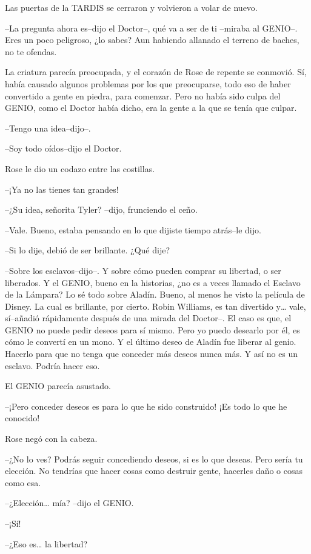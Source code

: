 Las puertas de la TARDIS se cerraron y volvieron a volar de nuevo.

--La pregunta ahora es--dijo el Doctor--, qué va a ser de ti --miraba al
GENIO--. Eres un poco peligroso, ¿lo sabes? Aun habiendo allanado el
terreno de baches, no te ofendas.

La criatura parecía preocupada, y el corazón de Rose de repente se
conmovió. Sí, había causado algunos problemas por los que preocuparse,
todo eso de haber convertido a gente en piedra, para comenzar. Pero no
había sido culpa del GENIO, como el Doctor había dicho, era la gente a
la que se tenía que culpar.

--Tengo una idea--dijo--.

--Soy todo oídos--dijo el Doctor.

Rose le dio un codazo entre las costillas.

--¡Ya no las tienes tan grandes!

--¿Su idea, señorita Tyler? --dijo, frunciendo el ceño.

--Vale. Bueno, estaba pensando en lo que dijiste tiempo atrás--le dijo.

--Si lo dije, debió de ser brillante. ¿Qué dije?

--Sobre los esclavos--dijo--. Y sobre cómo pueden comprar su libertad, o
ser liberados. Y el GENIO, bueno en la historias, ¿no es a veces llamado
el Esclavo de la Lámpara? Lo sé todo sobre Aladín. Bueno, al menos he
visto la película de Disney. La cual es brillante, por cierto. Robin
Williams, es tan divertido y\ldots{} vale, sí--añadió rápidamente
después de una mirada del Doctor--. El caso es que, el GENIO no puede
pedir deseos para sí mismo. Pero yo puedo desearlo por él, es cómo le
convertí en un mono. Y el último deseo de Aladín fue liberar al genio.
Hacerlo para que no tenga que conceder más deseos nunca más. Y así no es
un esclavo. Podría hacer eso.

El GENIO parecía asustado.

--¡Pero conceder deseos es para lo que he sido construido! ¡Es todo lo
que he conocido!

Rose negó con la cabeza.

--¿No lo ves? Podrás seguir concediendo deseos, si es lo que deseas.
Pero sería tu elección. No tendrías que hacer cosas como destruir gente,
hacerles daño o cosas como esa.

--¿Elección\ldots{} mía? --dijo el GENIO.

--¡Sí!

--¿Eso es\ldots{} la libertad?

